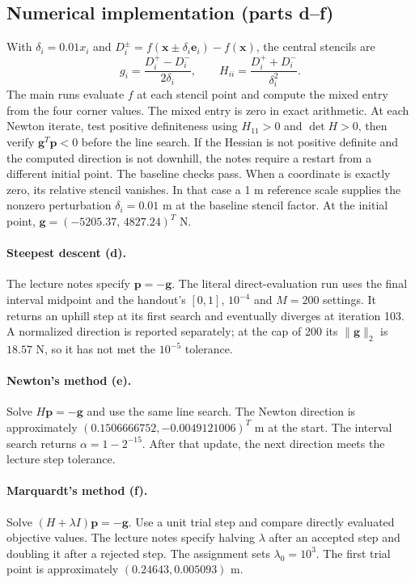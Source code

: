 \documentclass[11pt,a4paper]{article}
\begin{document}
\subsection{Numerical implementation (parts d--f)}
With $\delta_i=0.01x_i$ and $D_i^{\pm}=f(\bm x\pm\delta_i\bm e_i)-f(\bm x)$,
the central stencils are
\[
 g_i=\frac{D_i^+-D_i^-}{2\delta_i},\qquad
 H_{ii}=\frac{D_i^++D_i^-}{\delta_i^2}.
\]
The main runs evaluate $f$ at each stencil point and compute the mixed
entry from the four corner values. The mixed entry is zero in exact arithmetic. At each Newton iterate, test positive definiteness using $H_{11}>0$ and $\det H>0$, then verify $\bm g^T\bm p<0$ before the line search. If the Hessian is not positive definite and the computed direction is not downhill, the notes require a restart from a different initial point. The baseline checks pass. When a coordinate
is exactly zero, its relative stencil vanishes. In that case a 1 m reference
scale supplies the nonzero perturbation $\delta_i=0.01$ m at the baseline
stencil factor. At the initial
point, $\bm g=(-5205.37,\,4827.24)^T$ N.

\paragraph{Steepest descent (d).} The lecture notes specify
$\bm p=-\bm g$. The literal direct-evaluation run uses the final interval
midpoint and the handout's $[0,1]$, $10^{-4}$ and $M=200$ settings. It returns
an uphill step at its first search and eventually diverges at iteration 103.
A normalized direction is reported separately; at the cap of 200 its
$\|\bm g\|_2$ is $18.57$ N, so it has not met the $10^{-5}$ tolerance.

\paragraph{Newton's method (e).} Solve $H\bm p=-\bm g$ and use the same
line search. The Newton direction is approximately $(0.1506666752,-0.0049121006)^T$
m at the start. The interval search returns $\alpha=1-2^{-15}$. After that update,
the next direction meets the lecture step tolerance.

\paragraph{Marquardt's method (f).} Solve $(H+\lambda I)\bm p=-\bm g$.
Use a unit trial step and compare directly evaluated objective values.
The lecture notes specify halving $\lambda$ after an accepted step and
doubling it after a rejected step. The assignment sets $\lambda_0=10^3$.
The first trial point is approximately $(0.24643,0.005093)$ m.
\end{document}

